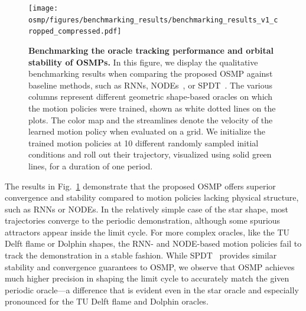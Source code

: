 \begin{figure}[ht!]
    \centering
    \texttt{[image: osmp/figures/benchmarking\_results/benchmarking\_results\_v1\_cropped\_compressed.pdf]}
    \caption{\textbf{Benchmarking the oracle tracking performance and orbital stability of \glspl{OSMP}.}
    In this figure, we display the qualitative benchmarking results when comparing the proposed \gls{OSMP} against baseline methods, such as \glspl{RNN}, \glspl{NODE}~\citep{chen2018neural}, or \gls{SPDT}~\citep{zhi2024teaching}. The various columns represent different geometric shape-based oracles on which the motion policies were trained, shown as white dotted lines on the plots. The color map and the streamlines denote the velocity of the learned motion policy when evaluated on a grid. We initialize the trained motion policies at 10 different randomly sampled initial conditions and roll out their trajectory, visualized using solid green lines, for a duration of one period.
    }
    \label{fig:osmp:benchmarking_results}
\end{figure}

The results in Fig.~\ref{fig:osmp:benchmarking_results} demonstrate that the proposed \gls{OSMP} offers superior convergence and stability compared to motion policies lacking physical structure, such as \glspl{RNN} or \glspl{NODE}. In the relatively simple case of the star shape, most trajectories converge to the periodic demonstration, although some spurious attractors appear inside the limit cycle. For more complex oracles, like the TU Delft flame or Dolphin shapes, the \gls{RNN}- and \gls{NODE}-based motion policies fail to track the demonstration in a stable fashion. While \gls{SPDT}~\citep{zhi2024teaching} provides similar stability and convergence guarantees to \gls{OSMP}, we observe that \gls{OSMP} achieves much higher precision in shaping the limit cycle to accurately match the given periodic oracle—a difference that is evident even in the star oracle and especially pronounced for the TU Delft flame and Dolphin oracles.

